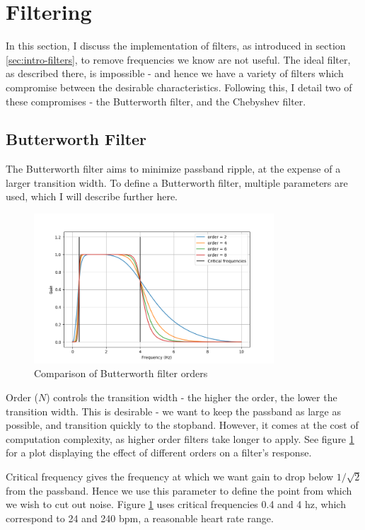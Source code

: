 \documentclass[12pt,a4paper,twoside,openany]{report}
\begin{document}
\section{Filtering}

In this section, I discuss the implementation of filters, as introduced in
section
\ref{sec:intro-filters}, to remove frequencies we know are not useful. 
The ideal filter, as described there, is impossible - and 
hence we have a
variety of filters which compromise between the desirable characteristics.
Following this, I detail two of these compromises - the Butterworth filter,
and the Chebyshev filter.


\subsection{Butterworth Filter}

The Butterworth filter aims to minimize passband ripple, at the expense of a
larger transition width. To define a Butterworth filter, multiple parameters
are used, which I will describe further here.

\begin{figure}[h]
	\centerline{\includegraphics[width=0.8\textwidth]{figs/butter-order-comparison.png}}
\caption{Comparison of Butterworth filter orders}
\label{fig:butterworth-order}
\end{figure}

Order (\(N\)) controls the transition width - the higher the order, the lower
the transition width. This is desirable - we want to keep the passband as
large as possible, and transition quickly to the stopband. However, it comes
at the cost of computation complexity, as higher order filters take longer to
apply. See figure \ref{fig:butterworth-order} for a plot displaying the effect
of different orders on a filter's response.

Critical frequency gives the frequency at which we want gain to drop below
\(1/\sqrt2\) from the passband. Hence we use this parameter to define the
point from which we wish to cut out noise. Figure \ref{fig:butterworth-order}
uses critical frequencies 0.4 and 4 hz, which correspond to 24 and 240 bpm, a
reasonable heart rate range.
\end{document}
